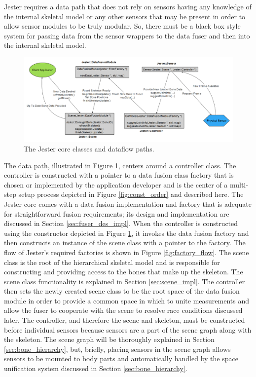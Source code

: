 Jester requires a data path that does not rely on sensors having any knowledge of the internal skeletal model or any other sensors that may be present in order to allow sensor modules to be truly modular. So, there must be a black box style system for passing data from the sensor wrappers to the data fuser and then into the internal skeletal model. 

\begin{figure}[]
\centering
\includegraphics[width=1\textwidth]{figures/mainDataFlow}
\caption{The Jester core classes and dataflow paths.}
\label{fig:broad_datapath}
\end{figure}

The data path, illustrated in Figure \ref{fig:broad_datapath}, centers around a controller class. The controller is constructed with a pointer to a data fusion class factory that is chosen or implemented by the application developer and is the center of a multi-step setup process depicted in Figure \ref{fig:const_order} and described here. The Jester core comes with a data fusion implementation and factory that is adequate for straightforward fusion requirements; its design and implementation are discussed in Section \ref{sec:fuser_des_impl}. When the controller is constructed using the constructor depicted in Figure \ref{fig:broad_datapath}, it invokes the data fusion factory and then constructs an instance of the scene class with a pointer to the factory. The flow of Jester's required factories is shown in Figure \ref{fig:factory_flow}. The scene class is the root of the hierarchical skeletal model and is responsible for constructing and providing access to the bones that make up the skeleton. The scene class functionality is explained in Section \ref{sec:scene_impl}. The controller then sets the newly created scene class to be the root space of the data fusion module in order to provide a common space in which to unite measurements and allow the fuser to cooperate with the scene to resolve race conditions discussed later. The controller, and therefore the scene and skeleton, must be constructed before individual sensors because sensors are a part of the scene graph along with the skeleton. The scene graph will be thoroughly explained in Section \ref{sec:bone_hierarchy}, but, briefly, placing sensors in the scene graph allows sensors to be mounted to body parts and automatically handled by the space unification system discussed in Section \ref{sec:bone_hierarchy}. 

